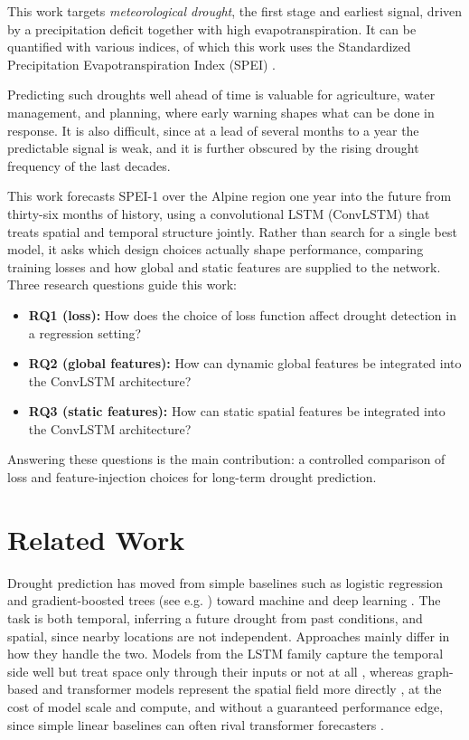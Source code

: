 \documentclass[
]{krantz}
\providecommand{\tightlist}{%
  \setlength{\itemsep}{0pt}\setlength{\parskip}{0pt}}
\begin{document}
This work targets \emph{meteorological drought}, the first stage and earliest signal, driven by a precipitation deficit together with high evapotranspiration.
It can be quantified with various indices, of which this work uses the Standardized Precipitation Evapotranspiration Index (SPEI) \citep{vicenteserrano2010}.

Predicting such droughts well ahead of time is valuable for agriculture, water management, and planning, where early warning shapes what can be done in response.
It is also difficult, since at a lead of several months to a year the predictable signal is weak, and it is further obscured by the rising drought frequency of the last decades.

This work forecasts SPEI-1 over the Alpine region one year into the future from thirty-six months of history, using a convolutional LSTM (ConvLSTM) that treats spatial and temporal structure jointly.
Rather than search for a single best model, it asks which design choices actually shape performance, comparing training losses and how global and static features are supplied to the network.
Three research questions guide this work:

\begin{itemize}
\tightlist
\item
  \textbf{RQ1 (loss):} How does the choice of loss function affect drought detection in a regression setting?
\item
  \textbf{RQ2 (global features):} How can dynamic global features be integrated into the ConvLSTM architecture?
\item
  \textbf{RQ3 (static features):} How can static spatial features be integrated into the ConvLSTM architecture?
\end{itemize}

Answering these questions is the main contribution: a controlled comparison of loss and feature-injection choices for long-term drought prediction.

\section{Related Work}\label{related-work}

Drought prediction has moved from simple baselines such as logistic regression and gradient-boosted trees (see e.g. \citet{marusov2024}) toward machine and deep learning \citep{nandgude2023}.
The task is both temporal, inferring a future drought from past conditions, and spatial, since nearby locations are not independent. Approaches mainly differ in how they handle the two.
Models from the LSTM family capture the temporal side well but treat space only through their inputs or not at all \citep{wang2023, chen2025}, whereas graph-based and transformer models represent the spatial field more directly \citep{yu2023, gao2023, pathak2022, nguyen2023}, at the cost of model scale and compute, and without a guaranteed performance edge, since simple linear baselines can often rival transformer forecasters \citep{zeng2022}.
\end{document}
